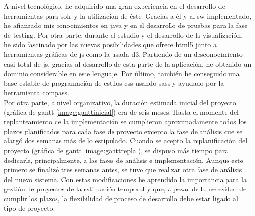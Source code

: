 A nivel tecnológico, he adquirido una gran experiencia en el desarrollo de herramientas para \gls{solr} y la  utilización de éste. Gracias a él y al \gls{sw} implementado, he afianzado mis conocimientos en \gls{java} y en el desarrollo de pruebas para la fase de \gls{testing}. Por otra parte, durante el estudio y el desarrollo de la visualización, he sido fascinado por las nuevas posibilidades que ofrece \gls{html5} junto a herramientas gráficas de \gls{js} como la usada \gls{d3}. Partiendo de un desconocimiento casi total de \gls{js}, gracias al desarrollo de esta parte de la aplicación, he obtenido un dominio considerable en este lenguaje. Por último, también he conseguido una base estable de programación de estilos \gls{css} usando  \gls{sass} y ayudado por la herramienta \gls{compass}.\\

Por otra parte, a nivel organizativo, la duración estimada inicial del proyecto (gráfica de \gls{gantt} \ref{image:ganttinicial}) era de seis meses. Hasta el momento del replanteamiento de la implementación se cumplieron aproximadamente todos los plazos planificados para cada fase de proyecto excepto la fase de análisis que se alargó dos semanas más de lo estipulado. Cuando se acepto la replanificación del proyecto (gráfica de \gls{gantt} \ref{image:ganttrepla}), se dispuso más tiempo para dedicarle, principalmente, a las fases de análisis e implementación. Aunque este primero se finalizó tres semanas antes, se tuvo que realizar otra fase de análisis del nuevo sistema. Con estas modificaciones he aprendido la importancia para la gestión de proyectos de la estimación temporal y que, a pesar de la necesidad de cumplir los plazos, la flexibilidad de proceso de desarrollo debe estar ligado al tipo de proyecto.


\begin{comment}
! replanificación, comprar con gannt
- Estudio previo
- Obencion de requisitos de visualizacion
- analisis
- diseño
- implementacion visualizacion

-> replanificaición
- EStido de las posiblidades para adaptar visualizacon
- analisis 
- diseño
- implementacion

ç

- la burocracia justificada no siempre es mala pero hay que tenerla en cuenta
- mi experiencia en el DLR, guai!!
- mi lucha con el dlr y el KF1


- mejora conocimenito java
. fascinación por javascript en html5
- sass, los estilos css son faciles!
- pattern lo hace mas facil
- las buenas formas hacen todo muy facil

\end{comment}




